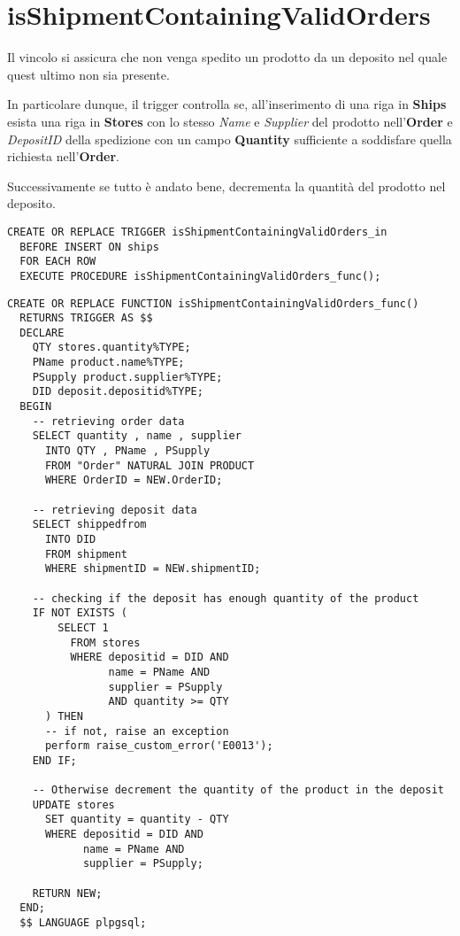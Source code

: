 \section{\textbf{isShipmentContainingValidOrders}}

Il vincolo si assicura che non venga spedito un prodotto da un deposito nel quale quest ultimo non sia presente.

In particolare dunque, il trigger controlla se, all'inserimento di una riga in \textbf{Ships} esista una riga in \textbf{Stores} con lo stesso \textit{Name} e \textit{Supplier} del prodotto nell'\textbf{Order} e \textit{DepositID} della spedizione con un campo \textbf{Quantity} sufficiente a soddisfare quella richiesta nell'\textbf{Order}.

Successivamente se tutto è andato bene, decrementa la quantità del prodotto nel deposito.

\begin{lstlisting}[caption={Creazione trigger \textbf{isShipmentContainingValidOrders}}]
  CREATE OR REPLACE TRIGGER isShipmentContainingValidOrders_in
  BEFORE INSERT ON ships
  FOR EACH ROW
  EXECUTE PROCEDURE isShipmentContainingValidOrders_func();
\end{lstlisting}

\newpage

\begin{lstlisting}[caption={Creazione funzione \textbf{isShipmentContainingValidOrders\_func}}]
  CREATE OR REPLACE FUNCTION isShipmentContainingValidOrders_func()
  RETURNS TRIGGER AS $$
  DECLARE
    QTY stores.quantity%TYPE;
    PName product.name%TYPE;
    PSupply product.supplier%TYPE;
    DID deposit.depositid%TYPE;
  BEGIN 
    -- retrieving order data
    SELECT quantity , name , supplier 
      INTO QTY , PName , PSupply
      FROM "Order" NATURAL JOIN PRODUCT
      WHERE OrderID = NEW.OrderID;
    
    -- retrieving deposit data
    SELECT shippedfrom
      INTO DID
      FROM shipment
      WHERE shipmentID = NEW.shipmentID;
  
    -- checking if the deposit has enough quantity of the product
    IF NOT EXISTS (
        SELECT 1
          FROM stores
          WHERE depositid = DID AND 
                name = PName AND 
                supplier = PSupply 
                AND quantity >= QTY
      ) THEN
      -- if not, raise an exception
      perform raise_custom_error('E0013');
    END IF;
    
    -- Otherwise decrement the quantity of the product in the deposit
    UPDATE stores
      SET quantity = quantity - QTY
      WHERE depositid = DID AND 
            name = PName AND 
            supplier = PSupply;
    
    RETURN NEW;
  END;
  $$ LANGUAGE plpgsql;
\end{lstlisting}

